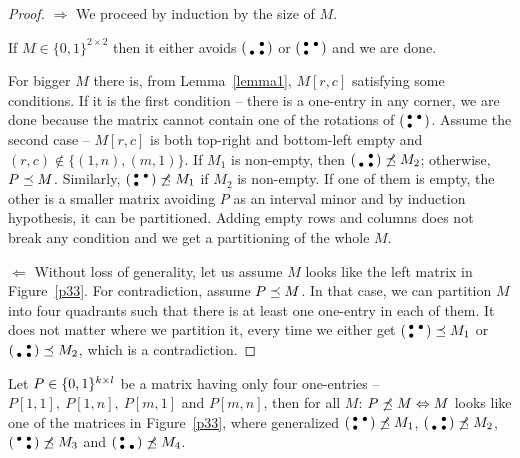 \begin{proof}
\item[$\Rightarrow$] We proceed by induction by the size of $M$.

If $M\in\{0,1\}^{2\times2}$ then it either avoids $\left(\begin{smallmatrix} &\bullet\\\bullet&\bullet\end{smallmatrix}\right)$ or $\left(\begin{smallmatrix}\bullet&\bullet\\\bullet& \end{smallmatrix}\right)$ and we are done.

For bigger $M$ there is, from Lemma~\ref{lemma1}, $M[r,c]$ satisfying some conditions. If it is the first condition -- there is a one-entry in any corner, we are done because the matrix cannot contain one of the rotations of $\left(\begin{smallmatrix}\bullet&\bullet\\\bullet& \end{smallmatrix}\right)$. Assume the second case -- $M[r,c]$ is both top-right and bottom-left empty and $(r,c)\not\in\{(1,n),(m,1)\}$. If $M_1$ is non-empty, then $\left(\begin{smallmatrix} &\bullet\\\bullet&\bullet\end{smallmatrix}\right)\not\preceq M_2$; otherwise, $P\preceq M$. Similarly, $\left(\begin{smallmatrix}\bullet&\bullet\\\bullet& \end{smallmatrix}\right)\not\preceq M_1$ if $M_2$ is non-empty. If one of them is empty, the other is a smaller matrix avoiding $P$ as an interval minor and by induction hypothesis, it can be partitioned. Adding empty rows and columns does not break any condition and we get a partitioning of the whole $M$.
\item[$\Leftarrow$] Without loss of generality, let us assume $M$ looks like the left matrix in Figure~\ref{p33}. For contradiction, assume $P\preceq M$. In that case, we can partition $M$ into four quadrants such that there is at least one one-entry in each of them. It does not matter where we partition it, every time we either get $\left(\begin{smallmatrix}\bullet&\bullet\\\bullet& \end{smallmatrix}\right)\preceq M_1$ or $\left(\begin{smallmatrix} &\bullet\\\bullet&\bullet\end{smallmatrix}\right)\preceq M_2$, which is a contradiction.
\end{proof}

\begin{thm}
Let $P\in\{0,1\}^{k\times l}$ be a matrix having only four one-entries -- $P[1,1],\ P[1,n],\ P[m,1]$ and $P[m,n]$, then for all $M$: $P\not\preceq M\Leftrightarrow M$ looks like one of the matrices in Figure~\ref{p33}, where generalized $\left(\begin{smallmatrix}\bullet&\bullet\\\bullet& \end{smallmatrix}\right)\not\preceq M_1$, $\left(\begin{smallmatrix} &\bullet\\\bullet&\bullet\end{smallmatrix}\right)\not\preceq M_2$, $\left(\begin{smallmatrix}\bullet&\bullet\\ &\bullet\end{smallmatrix}\right)\not\preceq M_3$ and $\left(\begin{smallmatrix}\bullet& \\\bullet&\bullet\end{smallmatrix}\right)\not\preceq M_4$.
\end{thm}

